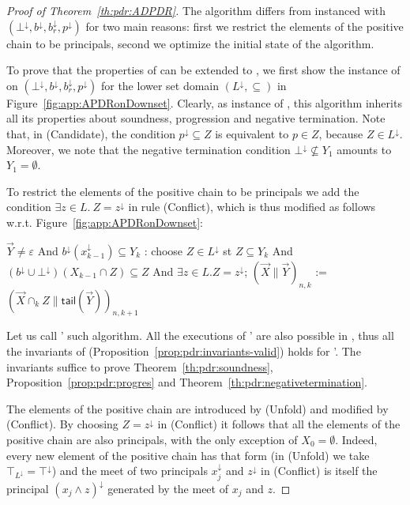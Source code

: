 \begin{proof}[Proof of Theorem~\ref{th:pdr:ADPDR}]
	The algorithm {\ADPDR} differs from {\APDR} instanced with $(\bot^\downarrow, b^\downarrow,b_r^{\downarrow}, p^{\downarrow})$ for two main reasons: first we restrict the elements of the positive chain to be principals, second we optimize the initial state of the algorithm.

	To prove that the properties of {\APDR} can be extended to {\ADPDR}, we first show the instance of {\APDR} on $(\bot^\downarrow, b^\downarrow,b_r^{\downarrow}, p^{\downarrow})$ for the lower set domain $(L^\downarrow,\subseteq)$ in Figure~\ref{fig:app:APDRonDownset}. Clearly, as instance of {\APDR}, this algorithm inherits all its properties about soundness, progression and negative termination.
	Note that, in (Candidate), the condition $p^\downarrow \subseteq Z$ is equivalent to $p\in Z$, because $Z\in L^\downarrow$.
	Moreover, we note that the negative termination condition $\bot^\downarrow \not \subseteq Y_1$ amounts to $Y_1 = \emptyset$.

	To restrict the elements of the positive chain to be principals we add the condition $\exists z \in L.~Z=z^\downarrow$ in rule (Conflict), which is thus modified as follows w.r.t. Figure~\ref{fig:app:APDRonDownset}:
	\begin{minipage}{\linewidth}
		\begin{codeNT}
$\vec{Y} \neq \varepsilon$ And $b^\downarrow(x^\downarrow_{k-1}) \subseteq Y_k$ :                        %
	choose $Z \in L^\downarrow$ st $Z \subseteq Y_k$ And $(b^\downarrow \cup \bot^\downarrow)(X_{k-1} \cap Z) \subseteq Z$
										 And $\exists z\in L. Z=z^\downarrow$;
	$(\vec{X} \| \vec{Y} )_{n,k}$ := $(\vec{X} \cap_k Z \| \mathsf{tail}(\vec{Y}) )_{n,k+1}$
\end{codeNT}
	\end{minipage}

	Let us call {\APDR'} such algorithm. All the executions of {\APDR'} are also possible in {\APDR}, thus all the invariants of {\APDR} (Proposition~\ref{prop:pdr:invariants-valid}) holds for {\APDR'}.
	The invariants suffice to prove Theorem~\ref{th:pdr:soundness}, Proposition~\ref{prop:pdr:progres} and Theorem~\ref{th:pdr:negativetermination}.

	The elements of the positive chain are introduced by (Unfold) and modified by (Conflict). By choosing $Z=z^\downarrow$ in (Conflict) it follows that all the elements of the positive chain are also principals, with the only exception of $X_0=\emptyset$. Indeed, every new element of the positive chain has that form (in (Unfold) we take $\top_{L^\downarrow}=\top^\downarrow$) and the meet of two principals $x_j^\downarrow$ and $z^\downarrow$ in (Conflict) is itself the principal $(x_j\land z)^\downarrow$ generated by the meet of $x_j$ and $z$.


\end{proof}

